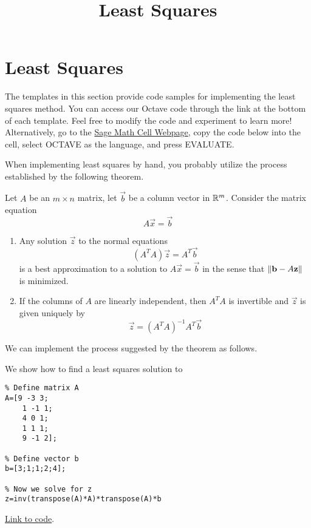 \documentclass{ximera}
\title{Least Squares} \license{CC BY-NC-SA 4.0}
\begin{document}
\begin{abstract}
\end{abstract}
\maketitle
\section*{Least Squares}

The templates in this section provide code samples for implementing the least squares method. You can access our Octave code through the link at the bottom of each template.  Feel free to modify the code and experiment to learn more!  Alternatively, go to the \href{https://sagecell.sagemath.org/}{Sage Math Cell Webpage}, copy the code below into the cell, select OCTAVE as the language, and press EVALUATE.  

When implementing least squares by hand, you probably utilize the process established by the following theorem.

\begin{theorem}[\ref{th:bestApprox}]
    Let $A$ be an $m\times n$ matrix, let $\vec{b}$ be a column vector in $\mathbb{R}^m$.  Consider the matrix equation
    $$A\vec{x}=\vec{b}$$
    \begin{enumerate}
        \item Any solution $\vec{z}$ to the normal equations
        $$\left(A^TA\right)\vec{z}=A^T\vec{b}$$
        is a best approximation to a solution to $A\vec{x}=\vec{b}$ in the sense that $\left\lVert\mathbf{b}-A\mathbf{z}\right\rVert$ is minimized.
        \item If the columns of $A$ are linearly independent, then $A^TA$ is invertible and $\vec{z}$ is given uniquely by
        $$\vec{z}=\left(A^TA\right)^{-1}A^T\vec{b}$$
    \end{enumerate}
    \end{theorem}

We can implement the process suggested by the theorem as follows.

\begin{template}\label{temp:leastSq}
    We show how to find a least squares solution to 

    \begin{verbatim}
% Define matrix A
A=[9 -3 3;
    1 -1 1;
    4 0 1;
    1 1 1; 
    9 -1 2];
        
% Define vector b
b=[3;1;1;2;4];

% Now we solve for z
z=inv(transpose(A)*A)*transpose(A)*b
    \end{verbatim}

\href{https://sagecell.sagemath.org/?z=eJxTVXBJTcvMS1XITSwpyqxQcOTlcrSNtlTQNVYwtublUgACQwVdQwVDKMdEwQDONgRBawUIxxKkyigWKgUCvFyqMMPLUpNL8osUkni5kmyjja0NgdDI2gSkGKTIL79coTxVoTg_pyxVIQ2oroqXq8o2M69Mo6QoMa-4IL84VcNRUwuIUPhJAN_XLTM=&lang=octave&interacts=eJyLjgUAARUAuQ==}{Link to code}.    
\end{template}
\end{document}
